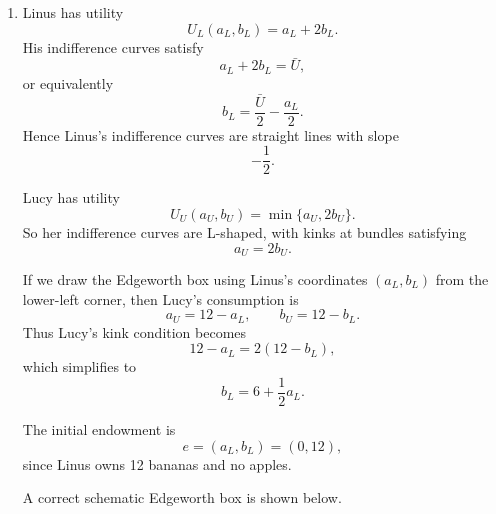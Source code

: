 \documentclass[12pt]{article}
\begin{document}
\begin{enumerate}[label=(\alph*)]
    \item
    Linus has utility
    \[
    U_L(a_L,b_L)=a_L+2b_L.
    \]
    His indifference curves satisfy
    \[
    a_L+2b_L=\bar U,
    \]
    or equivalently
    \[
    b_L=\frac{\bar U}{2}-\frac{a_L}{2}.
    \]
    Hence Linus's indifference curves are straight lines with slope
    \[
    -\frac12.
    \]

    Lucy has utility
    \[
    U_U(a_U,b_U)=\min\{a_U,2b_U\}.
    \]
    So her indifference curves are L-shaped, with kinks at bundles satisfying
    \[
    a_U=2b_U.
    \]

    If we draw the Edgeworth box using Linus's coordinates \((a_L,b_L)\) from the lower-left corner, then Lucy's consumption is
    \[
    a_U=12-a_L,\qquad b_U=12-b_L.
    \]
    Thus Lucy's kink condition becomes
    \[
    12-a_L=2(12-b_L),
    \]
    which simplifies to
    \[
    \boxed{b_L=6+\frac12 a_L.}
    \]

    The initial endowment is
    \[
    e=(a_L,b_L)=(0,12),
    \]
    since Linus owns 12 bananas and no apples.

    A correct schematic Edgeworth box is shown below.

\begin{center}
\end{center}
\end{enumerate}
\end{document}
